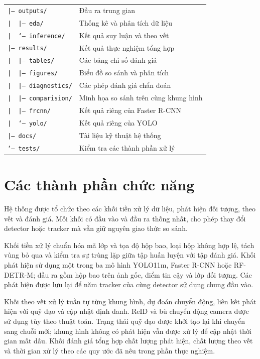 \documentclass[fontsize=13pt,a4paper,oneside,parskip=false,numbers=noenddot,bibliography=totoc]{scrreprt}
\begin{document}
\begin{table}[H]
\begin{tabularx}{\linewidth}{@{}l>{\raggedright\arraybackslash}X@{}}
    \texttt{|-- outputs/} & Đầu ra trung gian\\
    \texttt{|\ \ |-- eda/} & Thống kê và phân tích dữ liệu\\
    \texttt{|\ \ `-- inference/} & Kết quả suy luận và theo vết\\
    \texttt{|-- results/} & Kết quả thực nghiệm tổng hợp\\
    \texttt{|\ \ |-- tables/} & Các bảng chỉ số đánh giá\\
    \texttt{|\ \ |-- figures/} & Biểu đồ so sánh và phân tích\\
    \texttt{|\ \ |-- diagnostics/} & Các phép đánh giá chẩn đoán\\
    \texttt{|\ \ |-- comparision/} & Minh họa so sánh trên cùng khung hình\\
    \texttt{|\ \ |-- frcnn/} & Kết quả riêng của Faster R-CNN\\
    \texttt{|\ \ `-- yolo/} & Kết quả riêng của YOLO\\
    \texttt{|-- docs/} & Tài liệu kỹ thuật hệ thống\\
    \texttt{`-- tests/} & Kiểm tra các thành phần xử lý\\
    \bottomrule
  \end{tabularx}
\end{table}

\section{Các thành phần chức năng}
Hệ thống được tổ chức theo các khối tiền xử lý dữ liệu, phát hiện đối tượng, theo vết và đánh giá. Mỗi khối có đầu vào và đầu ra thống nhất, cho phép thay đổi detector hoặc tracker mà vẫn giữ nguyên giao thức so sánh.

Khối tiền xử lý chuẩn hóa mã lớp và tọa độ hộp bao, loại hộp không hợp lệ, tách vùng bỏ qua và kiểm tra sự trùng lặp giữa tập huấn luyện với tập đánh giá. Khối phát hiện sử dụng một trong ba mô hình YOLO11m, Faster R-CNN hoặc RF-DETR-M; đầu ra gồm hộp bao trên ảnh gốc, điểm tin cậy và lớp đối tượng. Các phát hiện được lưu lại để năm tracker của cùng detector sử dụng chung đầu vào.

Khối theo vết xử lý tuần tự từng khung hình, dự đoán chuyển động, liên kết phát hiện với quỹ đạo và cập nhật định danh. ReID và bù chuyển động camera được sử dụng tùy theo thuật toán. Trạng thái quỹ đạo được khởi tạo lại khi chuyển sang chuỗi mới; khung hình không có phát hiện vẫn được xử lý để cập nhật thời gian mất dấu. Khối đánh giá tổng hợp chất lượng phát hiện, chất lượng theo vết và thời gian xử lý theo các quy ước đã nêu trong phần thực nghiệm.
\end{document}
